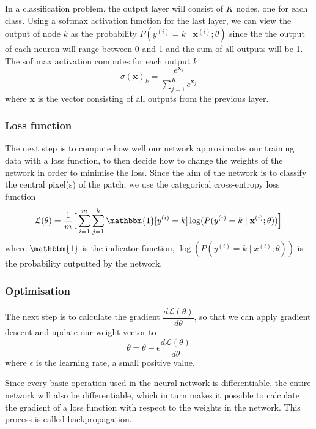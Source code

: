 \documentclass[12pt,a4paper,twoside,openright]{report}
\begin{document}
In a classification problem, the output layer will consist of $K$ nodes, one for each class. Using a softmax activation function for the last layer, we can view the output of node $k$ as the probability $P(y^{(i)} = k \mid \mathbf{x}^{(i)};\theta)$ since the the output of each neuron will range between 0 and 1 and the sum of all outputs will be 1. The softmax activation computes for each output $k$
\begin{equation}
	\sigma(\mathbf{x})_k = \frac{e^{\mathbf{x}_k}}{\sum_{j=1}^{K}e^{\mathbf{x}_j}}
\end{equation}
where $\mathbf{x}$ is the vector consisting of all outputs from the previous layer.

\subsubsection{Loss function}
The next step is to compute how well our network approximates our training data with a loss function, to then decide how to change the weights of the network in order to minimise the loss. Since the aim of the network is to classify the central pixel(s) of the patch, we use the categorical cross-entropy loss function
\begin{equation}
	\label{eq:loss}
	\mathcal{L}(\theta) = 
	\frac{1}{m}\Big[\sum_{i=1}^m \sum_{j=1}^k\mathbbm{1}[y^{(i)} = k]\log(P(y^{(i)}=k \mid \mathbf{x}^{(i)};\theta))\Big]
\end{equation}
where $\mathbbm{1}$ is the indicator function, $\log(P(y^{(i)}=k \mid x^{(i)};\theta))$ is the probability outputted by the network.

\subsubsection{Optimisation}
The next step is to calculate the gradient $\dfrac{d\mathcal{L}(\theta)}{d\theta}$, so that we can apply gradient descent and update our weight vector to
\begin{equation}
	\theta = \theta - \epsilon \frac{d\mathcal{L}(\theta)}{d\theta}
\end{equation}
where $\epsilon$ is the learning rate, a small positive value.

Since every basic operation used in the neural network is differentiable, the entire network will also be differentiable, which in turn makes it possible to calculate the gradient of a loss function with respect to the weights in the network. This process is called backpropagation.
\end{document}
